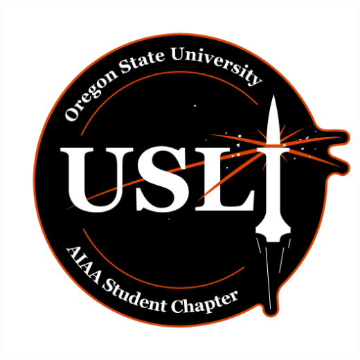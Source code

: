 \documentclass[onecolumn, draftclsnofoot, 10pt, compsoc]{IEEEtran}
\begin{document}
\begin{titlepage}
    \begin{singlespace}
        \hfill 
        \begin{center}
           \includegraphics[scale = 0.4]{osu_usli_logo.png}\\[1.0 cm]


\end{center}
\end{singlespace}
\end{titlepage}
\end{document}
